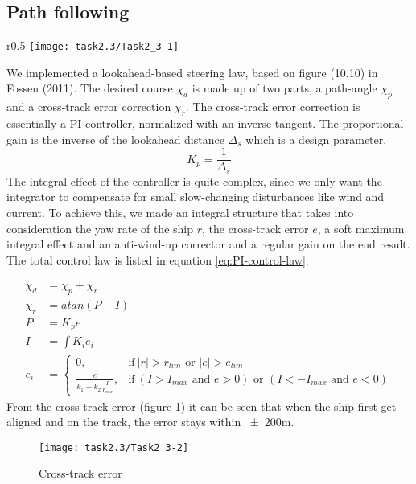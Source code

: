 \subsection{Path following}\label{subsec:prob2.2}
\begin{wrapfigure}{r}{0.5 \textwidth}
   \vspace{-30pt}
   \centering
    \texttt{[image: task2.3/Task2\_3-1]}
    \vspace{-20pt}
    \caption{Path following}
    \label{fig:2.3-path}
    \vspace{-10pt}
\end{wrapfigure}

We implemented a lookahead-based steering law, based on figure (10.10) in Fossen (2011). The desired course $\chi_d$ is made up of two parts, a path-angle $\chi_p$ and a cross-track error correction $\chi_r$. The cross-track error correction is essentially a PI-controller, normalized with an inverse tangent. The proportional gain is the inverse of the lookahead distance $\Delta_s$ which is a design parameter.
\begin{equation}
	K_p = \frac{1}{\Delta_s}
\end{equation}
The integral effect of the controller is quite complex, since we only want the integrator to compensate for small slow-changing disturbances like wind and current. To achieve this, we made an integral structure that takes into consideration the yaw rate of the ship $r$, the cross-track error $e$, a soft maximum integral effect and an anti-wind-up corrector and a regular gain on the end result. The total control law is listed in equation \ref{eq:PI-control-law}.

\begin{equation}
\begin{split}
	\chi_d &= \chi_p + \chi_r \\
	\chi_r &= atan(P - I) \\
	P &= K_p e \\
	I &= \int K_i e_i \\
	e_i &=	\begin{cases}
			0,								& \text{if}\ | r | > r_{lim} \text{ or }  | e | > e_{lim} \\
      			\frac{e}{k_1+k_2 \frac{| I |}{I_{max}}},		& \text{if}\ (I > I_{max} \text{ and } e>0) \text{ or }( I< -I_{max} \text{ and } e<0 )
      			\end{cases}
\end{split}
\label{eq:PI-control-law}
\end{equation}
From the cross-track error (figure \ref{fig:2.3-error}) it can be seen that when the ship first get aligned and on the track, the error stays within \num{\pm200}{m}.

\begin{figure}[ht]
   \centering
    \texttt{[image: task2.3/Task2\_3-2]}
    \caption{Cross-track error}
    \label{fig:2.3-error}
\end{figure}

